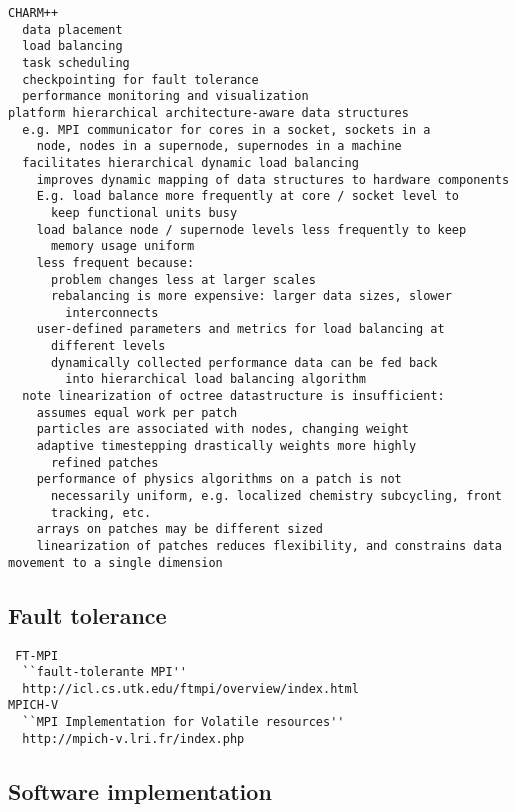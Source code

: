 \documentclass[14pt,letter]{article}
\begin{document}
\begin{verbatim}
CHARM++ 
  data placement
  load balancing
  task scheduling
  checkpointing for fault tolerance
  performance monitoring and visualization
platform hierarchical architecture-aware data structures
  e.g. MPI communicator for cores in a socket, sockets in a
    node, nodes in a supernode, supernodes in a machine
  facilitates hierarchical dynamic load balancing
    improves dynamic mapping of data structures to hardware components
    E.g. load balance more frequently at core / socket level to
      keep functional units busy
    load balance node / supernode levels less frequently to keep
      memory usage uniform
    less frequent because:
      problem changes less at larger scales
      rebalancing is more expensive: larger data sizes, slower
        interconnects
    user-defined parameters and metrics for load balancing at
      different levels
      dynamically collected performance data can be fed back
        into hierarchical load balancing algorithm
  note linearization of octree datastructure is insufficient:
    assumes equal work per patch
    particles are associated with nodes, changing weight
    adaptive timestepping drastically weights more highly
      refined patches
    performance of physics algorithms on a patch is not
      necessarily uniform, e.g. localized chemistry subcycling, front
      tracking, etc.
    arrays on patches may be different sized
    linearization of patches reduces flexibility, and constrains data movement to a single dimension
\end{verbatim}

\subsection{Fault tolerance} \label{ss:fault-tolerance}

\begin{verbatim}
 FT-MPI 
  ``fault-tolerante MPI''
  http://icl.cs.utk.edu/ftmpi/overview/index.html 
MPICH-V 
  ``MPI Implementation for Volatile resources''
  http://mpich-v.lri.fr/index.php 
\end{verbatim}

\subsection{Software implementation} \label{ss:implementation}
\end{document}
